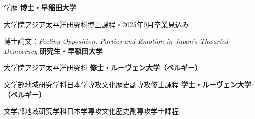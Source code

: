 \begin{rubric}{学歴}
\entry*[2020/9 -- 現在]%
	\textbf{博士・早稲田大学}
        \par 大学院アジア太平洋研究科博士課程・2025年9月卒業見込み
	\par 博士論文：\emph{Feeling Opposition: Parties and Emotion in Japan's Thwarted Democracy}
%
\entry*[2019/4 -- 2020/9]%
	\textbf{研究生・早稲田大学}
        \par 大学院アジア太平洋研究科
%
\entry*[2014/9 -- 2016/9]%
	\textbf{修士・ルーヴェン大学（ベルギー）}
        \par 文学部地域研究学科日本学専攻文化歴史副専攻修士課程
%
\entry*[2010/9 -- 2014/9]%
	\textbf{学士・ルーヴェン大学（ベルギー）}
        \par 文学部地域研究学科日本学専攻文化歴史副専攻学士課程
\end{rubric}